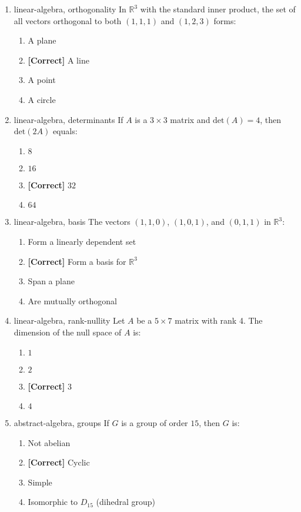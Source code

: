 \documentclass{article}
\newenvironment{problem}{\item}{}
\newcommand{\choice}{\item}
\newcommand{\correctchoice}{\item \textbf{[Correct] }}
\newcommand{\tags}[1]{#1} %
\begin{document}
\begin{enumerate}
        \begin{problem}
            \tags{linear-algebra, orthogonality}
            In $\mathbb{R}^3$ with the standard inner product, the set of all vectors orthogonal to both $(1,1,1)$ and $(1,2,3)$ forms:
            \begin{enumerate}
                \choice A plane
                \correctchoice A line
                \choice A point
                \choice A circle
            \end{enumerate}
        \end{problem}
        
        \begin{problem}
            \tags{linear-algebra, determinants}
            If $A$ is a $3 \times 3$ matrix and $\text{det}(A) = 4$, then $\text{det}(2A)$ equals:
            \begin{enumerate}
                \choice $8$
                \choice $16$
                \correctchoice $32$
                \choice $64$
            \end{enumerate}
        \end{problem}
        
        \begin{problem}
            \tags{linear-algebra, basis}
            The vectors $(1,1,0)$, $(1,0,1)$, and $(0,1,1)$ in $\mathbb{R}^3$:
            \begin{enumerate}
                \choice Form a linearly dependent set
                \correctchoice Form a basis for $\mathbb{R}^3$
                \choice Span a plane
                \choice Are mutually orthogonal
            \end{enumerate}
        \end{problem}
        
        \begin{problem}
            \tags{linear-algebra, rank-nullity}
            Let $A$ be a $5 \times 7$ matrix with rank 4. The dimension of the null space of $A$ is:
            \begin{enumerate}
                \choice $1$
                \choice $2$
                \correctchoice $3$
                \choice $4$
            \end{enumerate}
        \end{problem}

        \begin{problem}
            \tags{abstract-algebra, groups}
            If $G$ is a group of order $15$, then $G$ is:
            \begin{enumerate}
                \choice Not abelian
                \correctchoice Cyclic
                \choice Simple
                \choice Isomorphic to $D_{15}$ (dihedral group)
            \end{enumerate}
        \end{problem}
        

\end{enumerate}
\end{document}
